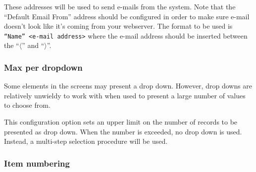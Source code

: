These addresses will be used to send e-mails from the system.
Note that the ``Default Email From'' address should be configured in order to make sure
e-mail doesn't look like it's coming from your webserver. The format to be used is \texttt{``Name'' <e-mail address>} where the e-mail address should be inserted between the
``$\langle$'' and ``$\rangle$''.

\subsubsection{Max per dropdown}

Some elements in the screens may present a drop down. However, drop downs are
relatively unwieldy to work with when used to present a large number of values
to choose from.

This configuration option sets an upper limit on the number of records to be
presented as drop down.  When the number is exceeded, no drop down is used.  Instead,
a multi-step selection procedure will be used.

\subsubsection{Item numbering}
\label{sec:DefaultsItemNumbering}

